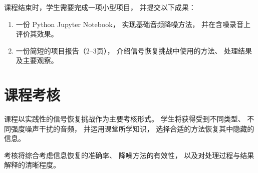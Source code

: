 \documentclass[12pt,fontset=none]{ctexart}
\begin{document}
课程结束时，学生需要完成一项小型项目，
并提交以下成果：

\begin{enumerate}
  \item 一份 Python Jupyter Notebook，
  实现基础音频降噪方法，
  并在含噪录音上评价其效果。

  \item 一份简短的项目报告（2--3页），
  介绍信号恢复挑战中使用的方法、
  处理结果及主要观察。
\end{enumerate}

\section{课程考核}

课程以实践性的信号恢复挑战作为主要考核形式。
学生将获得受到不同类型、
不同强度噪声干扰的音频，
并运用课堂所学知识，
选择合适的方法恢复其中隐藏的信息。

考核将综合考虑信息恢复的准确率、
降噪方法的有效性，
以及对处理过程与结果解释的清晰程度。
\end{document}
